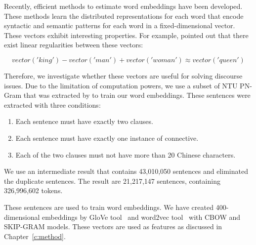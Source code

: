 Recently, efficient methods to estimate word embeddings have been developed.
These methods learn the distributed representations for each word that encode
syntactic and semantic patterns for each word in a fixed-dimensional vector.
These vectors exhibit interesting properties. For example,
\cite{mikolov2013linguistic} pointed out that there exist linear regularities
between these vectors:

$$ vector('king') - vector('man') + vector('woman') \approx vector('queen') $$

Therefore, we investigate whether these vectors are useful for solving
discourse issues. Due to the limitation of computation powers, we use
a subset of NTU PN-Gram that was extracted by \cite{huang2014interpretation}
to train our word embeddings. These sentences were extracted with three conditions:

\begin{enumerate}
\item Each sentence must have exactly two clauses.
\item Each sentence must have exactly one instance of connective.
\item Each of the two clauses must not have more than 20 Chinese characters.
\end{enumerate}

We use an intermediate result that contains 43,010,050 sentences and eliminated
the duplicate sentences. The result are 21,217,147 sentences, containing
326,996,602 tokens.

These sentences are used to train word embeddings.
We have created 400-dimensional embeddings by GloVe tool~\citep{pennington2014glove}
and word2vec tool~\citep{mikolov2013efficient,mikolov2013distributed} with CBOW and
SKIP-GRAM models. These vectors are used as features as discussed in Chapter~\ref{c:method}.
